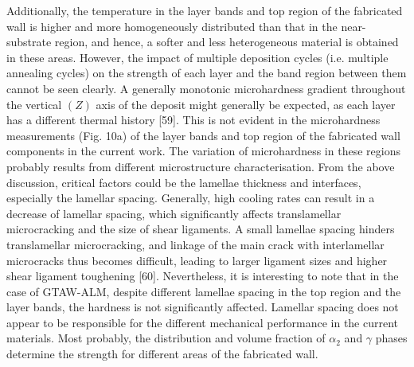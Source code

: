 \documentclass[10pt]{article}
\begin{document}
Additionally, the temperature in the layer bands and top region of the fabricated wall is higher and more homogeneously distributed than that in the near-substrate region, and hence, a softer and less heterogeneous material is obtained in these areas. However, the impact of multiple deposition cycles (i.e. multiple annealing cycles) on the strength of each layer and the band region between them cannot be seen clearly. A generally monotonic microhardness gradient throughout the vertical $(Z)$ axis of the deposit might generally be expected, as each layer has a different thermal history [59]. This is not evident in the microhardness measurements (Fig. 10a) of the layer bands and top region of the fabricated wall components in the current work. The variation of microhardness in these regions probably results from different microstructure characterisation. From the above discussion, critical factors could be the lamellae thickness and interfaces, especially the lamellar spacing. Generally, high cooling rates can result in a decrease of lamellar spacing, which significantly affects translamellar microcracking and the size of shear ligaments. A small lamellae spacing hinders translamellar microcracking, and linkage of the main crack with interlamellar microcracks thus becomes difficult, leading to larger ligament sizes and higher shear ligament toughening [60]. Nevertheless, it is interesting to note that in the case of GTAW-ALM, despite different lamellae spacing in the top region and the layer bands, the hardness is not significantly affected. Lamellar spacing does not appear to be responsible for the different mechanical performance in the current materials. Most probably, the distribution and volume fraction of $\alpha_{2}$ and $\gamma$ phases determine the strength for different areas of the fabricated wall.
\end{document}
